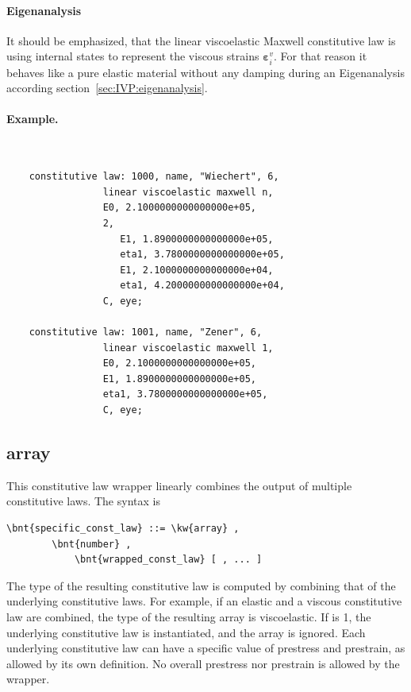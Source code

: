 \paragraph{Eigenanalysis}
It should be emphasized, that the linear viscoelastic Maxwell constitutive law is using internal states
to represent the viscous strains $\boldsymbol{\varepsilon}_i^v$.
For that reason it behaves like a pure elastic material without any damping
during an Eigenanalysis according section~\ref{sec:IVP:eigenanalysis}.
\paragraph{Example.} \
\begin{verbatim}
    constitutive law: 1000, name, "Wiechert", 6,
                 linear viscoelastic maxwell n,
                 E0, 2.1000000000000000e+05,
                 2,
                    E1, 1.8900000000000000e+05,
                    eta1, 3.7800000000000000e+05,
                    E1, 2.1000000000000000e+04,
                    eta1, 4.2000000000000000e+04,
                 C, eye;

    constitutive law: 1001, name, "Zener", 6,
                 linear viscoelastic maxwell 1,
                 E0, 2.1000000000000000e+05,
                 E1, 1.8900000000000000e+05,
                 eta1, 3.7800000000000000e+05,
                 C, eye;
\end{verbatim}

\subsection{array}
This constitutive law wrapper linearly combines the output
of multiple constitutive laws.
The syntax is
\begin{Verbatim}[commandchars=\\\{\}]
    \bnt{specific_const_law} ::= \kw{array} ,
        \bnt{number} ,
            \bnt{wrapped_const_law} [ , ... ]
\end{Verbatim}
The type of the resulting constitutive law is computed by combining
that of the underlying constitutive laws.
For example, if an elastic and a viscous constitutive law are combined,
the type of the resulting array is viscoelastic.
If  is 1, the underlying constitutive law is instantiated,
and the array is ignored.
Each underlying constitutive law can have a specific value
of prestress and prestrain, as allowed by its own definition.
No overall prestress nor prestrain is allowed by the  wrapper.


